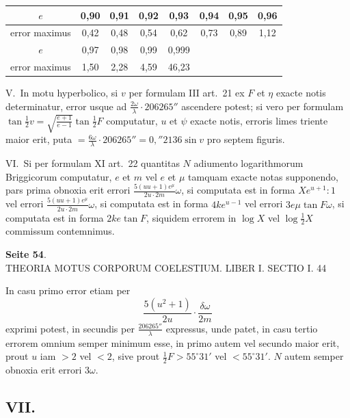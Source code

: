 \documentclass[12pt,a4paper]{article}
\begin{document}
\begin{center}
\begin{tabular}{c|c|c|c|c|c|c|c}
$e$ & 0,90 & 0,91 & 0,92 & 0,93 & 0,94 & 0,95 & 0,96 \\
\hline
error maximus & 0,42 & 0,48 & 0,54 & 0,62 & 0,73 & 0,89 & 1,12 \\[-2pt]
$e$ & 0,97 & 0,98 & 0,99 & 0,999 & & & \\
\hline
error maximus & 1,50 & 2,28 & 4,59 & 46,23 & & & \\
\end{tabular}
\end{center}

V.~In motu hyperbolico, si $v$ per formulam III art.~21 ex $F$ et $\eta$ exacte notis determinatur, error usque ad $\frac{2\omega}{\lambda} \cdot 206265''$ ascendere potest; si vero per formulam $\tan \frac{1}{2}v = \sqrt{\frac{e+1}{e-1}} \tan \frac{1}{2}F$ computatur, $u$ et $\psi$ exacte notis, erroris limes triente maior erit, puta $= \frac{6\omega}{\lambda} \cdot 206265'' = 0{,}''2136 \sin v$ pro septem figuris.

VI.~Si per formulam XI art.~22 quantitas $N$ adiumento logarithmorum Briggicorum computatur, $e$ et $m$ vel $e$ et $\mu$ tamquam exacte notas supponendo, pars prima obnoxia erit errori $\frac{5(uu+1)e^{\mu}}{2u \cdot 2m}\omega$, si computata est in forma $Xe^{u+1}:1$ vel errori $\frac{5(uu+1)e^{\mu}}{2u \cdot 2m}\omega$, si computata est in forma $4ke^{u-1}$ vel errori $3e\mu \tan F\omega$, si computata est in forma $2k e \tan F$, siquidem errorem in $\log X$ vel $\log \frac{1}{2}X$ commissum contemnimus.

\textbf{Seite 54}.\\
THEORIA MOTUS CORPORUM COELESTIUM. LIBER I. SECTIO I. 44

In casu primo error etiam per
\[
\frac{5(u^2+1)}{2u} \cdot \frac{\delta \omega}{2m}
\]
exprimi potest, in secundis per $\frac{206265''}{\lambda}$ expressus, unde patet, in casu tertio errorem omnium semper minimum esse, in primo autem vel secundo maior erit, prout $u$ iam $> 2$ vel $< 2$, sive prout $\frac{1}{2}F > 55^\circ 31'$ vel $< 55^\circ 31'$. $N$ autem semper obnoxia erit errori $3\omega$.

\subsection*{VII.}
\end{document}
